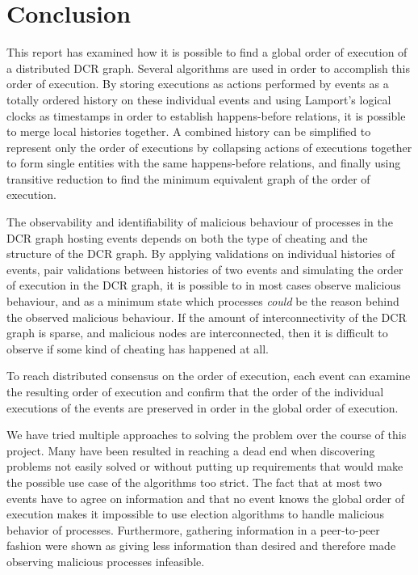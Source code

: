 \chapter{Conclusion}
This report has examined how it is possible to find a global order of execution of a distributed DCR graph. Several algorithms are used in order to accomplish this order of execution. By storing executions as actions performed by events as a totally ordered history on these individual events and using Lamport's logical clocks as timestamps in order to establish happens-before relations, it is possible to merge local histories together. A combined history can be simplified to represent only the order of executions by collapsing actions of executions together to form single entities with the same happens-before relations, and finally using transitive reduction to find the minimum equivalent graph of the order of execution.

The observability and identifiability of malicious behaviour of processes in the DCR graph hosting events depends on both the type of cheating and the structure of the DCR graph. By applying validations on individual histories of events, pair validations between histories of two events and simulating the order of execution in the DCR graph, it is possible to in most cases observe malicious behaviour, and as a minimum state which processes \textit{could} be the reason behind the observed malicious behaviour. If the amount of interconnectivity of the DCR graph is sparse, and malicious nodes are interconnected, then it is difficult to observe if some kind of cheating has happened at all.

To reach distributed consensus on the order of execution, each event can examine the resulting order of execution and confirm that the order of the individual executions of the events are preserved in order in the global order of execution.


\newpar We have tried multiple approaches to solving the problem over the course of this project. Many have been resulted in reaching a dead end when discovering problems not easily solved or without putting up requirements that would make the possible use case of the algorithms too strict. The fact that at most two events have to agree on information and that no event knows the global order of execution makes it impossible to use election algorithms to handle malicious behavior of processes. Furthermore, gathering information in a peer-to-peer fashion were shown as giving less information than desired and therefore made observing malicious processes infeasible.

